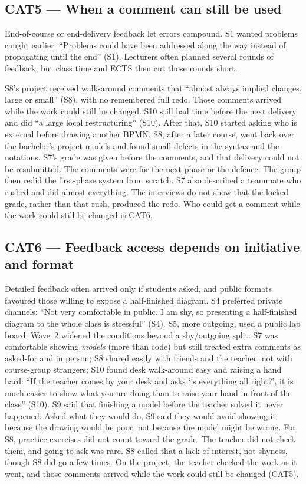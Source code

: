 \subsection{CAT5 --- When a comment can still be used}
\label{sec:cat5}

End-of-course or end-delivery feedback let errors compound. S1 wanted problems caught earlier: ``Problems could have been addressed along the way instead of propagating until the end'' (S1). Lecturers often planned several rounds of feedback, but class time and ECTS then cut those rounds short.

S8's project received walk-around comments that ``almost always implied changes, large or small'' (S8), with no remembered full redo. Those comments arrived while the work could still be changed. S10 still had time before the next delivery and did ``a large local restructuring'' (S10). After that, S10 started asking who is external before drawing another BPMN. S8, after a later course, went back over the bachelor's-project models and found small defects in the syntax and the notations. S7's grade was given before the comments, and that delivery could not be resubmitted. The comments were for the next phase or the defence. The group then redid the first-phase system from scratch. S7 also described a teammate who rushed and did almost everything. The interviews do not show that the locked grade, rather than that rush, produced the redo. Who could get a comment while the work could still be changed is CAT6.

\subsection{CAT6 --- Feedback access depends on initiative and format}
\label{sec:cat6}

Detailed feedback often arrived only if students asked, and public formats favoured those willing to expose a half-finished diagram. S4 preferred private channels: ``Not very comfortable in public. I am shy, so presenting a half-finished diagram to the whole class is stressful'' (S4). S5, more outgoing, used a public lab board. Wave~2 widened the conditions beyond a shy/outgoing split: S7 was comfortable showing \emph{models} (more than code) but still treated extra comments as asked-for and in person; S8 shared easily with friends and the teacher, not with course-group strangers; S10 found desk walk-around easy and raising a hand hard: ``If the teacher comes by your desk and asks `is everything all right?', it is much easier to show what you are doing than to raise your hand in front of the class'' (S10). S9 said that finishing a model before the teacher solved it never happened. Asked what they would do, S9 said they would avoid showing it because the drawing would be poor, not because the model might be wrong. For S8, practice exercises did not count toward the grade. The teacher did not check them, and going to ask was rare. S8 called that a lack of interest, not shyness, though S8 did go a few times. On the project, the teacher checked the work as it went, and those comments arrived while the work could still be changed (CAT5).

